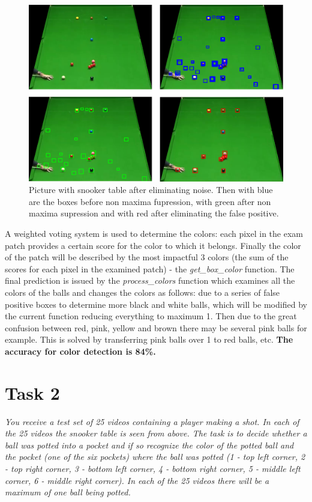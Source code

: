 \documentclass[12pt]{article}
\begin{document}
\begin{figure}[H]
    \centering
    \includegraphics[scale=0.45]{1.png}
    \caption{Picture with snooker table after eliminating noise. Then with blue are the boxes 
    before non maxima fupression, with green after non maxima supression and with red after 
    eliminating the false positive.}   
    \label{fig:picture}
\end{figure}

A weighted voting system is used to determine the colors: each pixel in the exam patch provides 
a certain score for the color to which it belongs. Finally the color of the patch will be 
described by the most impactful 3 colors (the sum of the scores for each pixel in the examined 
patch) - the \emph{get\_box\_color} function. The final prediction is issued by the \emph{process\_colors} 
function which examines all the colors of the balls and changes the colors as follows: due 
to a series of false positive boxes to determine more black and white balls, which will be 
modified by the current function reducing everything to maximum 1. Then due to the great 
confusion between red, pink, yellow and brown there may be several pink balls for example. 
This is solved by transferring pink balls over 1 to red balls, etc. \textbf{The accuracy for color 
detection is 84\%.} \par

\section*{Task 2}

\emph{You receive a test set of 25 videos containing a player making a shot. In each
of the 25 videos the snooker table is seen from above. The task is to decide whether
a ball was potted into a pocket and if so recognize the color of the potted ball and
the pocket (one of the six pockets) where the ball was potted
(1 - top left corner, 2 - top right corner, 3 - bottom left corner, 4 - bottom right corner, 5
- middle left corner, 6 - middle right corner). 
In each of the 25 videos there will be a maximum of one ball being potted.}
\end{document}
